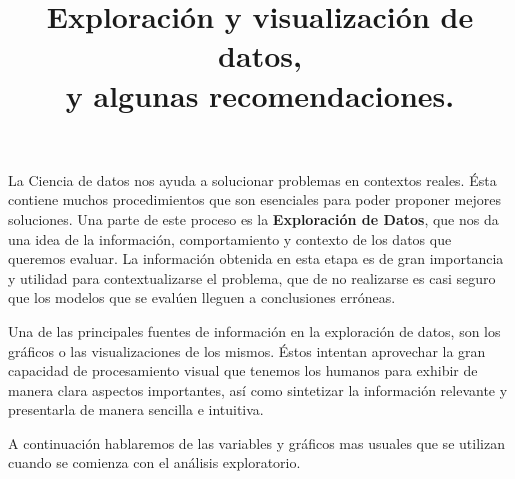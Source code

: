 \documentclass[conference, a4paper]{IEEEtran_ID}
\begin{document}
\title{\huge{Exploración y visualización de datos, \\ 
y algunas recomendaciones.} %
}

\author{
\vspace{0.6em}
\vspace{0.1em}
}

\maketitle
\thispagestyle{fancy}

%


\bigskip
\bigskip

La Ciencia de datos nos ayuda a solucionar problemas en contextos reales. Ésta contiene muchos procedimientos que son esenciales para poder proponer mejores soluciones. Una parte de este proceso es la \textbf{Exploración de Datos}, que nos da una idea de la información, comportamiento y contexto de los datos que queremos evaluar. La información obtenida en esta etapa es de gran importancia y utilidad para contextualizarse el problema, que de no realizarse es casi seguro que los modelos que se evalúen lleguen a conclusiones erróneas. 

Una de las principales fuentes de información en la exploración de datos, son los gráficos o las visualizaciones de los mismos. Éstos intentan aprovechar la gran capacidad de procesamiento visual que tenemos los humanos para exhibir de manera clara aspectos importantes, así como sintetizar la información relevante y presentarla de manera sencilla e intuitiva. 

A continuación hablaremos de las variables y gráficos mas usuales que se utilizan cuando se comienza con el análisis exploratorio.

\bigskip
\end{document}
